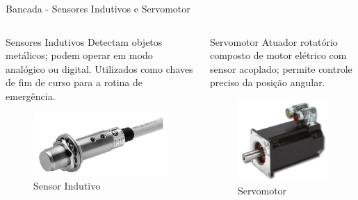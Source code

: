 \documentclass[10pt]{beamer}
\begin{document}
\begin{frame}[fragile]{Bancada - Sensores Indutivos e Servomotor}

\begin{columns}[T]

\begin{column}{.5\textwidth}

\begin{block}{Sensores Indutivos}
Detectam objetos metálicos; podem operar em modo analógico ou digital. Utilizados como chaves de fim de curso para a rotina de emergência.
\end{block}

\begin{figure}[!ht]
	\centering
	\includegraphics[width=.6\linewidth]{figures/fundamentos/sensorIndutivo}
	\caption{Sensor Indutivo \cite{redytton}}
	\label{bancadaindut}
\end{figure}

\end{column}

\begin{column}{.5\textwidth}

\begin{block}{Servomotor}
Atuador rotatório composto de motor elétrico com sensor acoplado; permite controle preciso da posição angular.
\end{block}

\begin{figure}[!ht]
	\centering
	\includegraphics[width=.5\linewidth]{figures/fundamentos/servomotor}
	\caption{Servomotor \cite{redytton}}
	\label{bancadaservo}
\end{figure}

\end{column}

\end{columns}

\end{frame}
\end{document}
